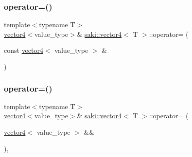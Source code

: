 \mbox{\label{classsaki_1_1vector4_a0fba7bd5e55de03aca8c11a952e7217f}} 
\subsubsection{\texorpdfstring{operator=()}{operator=()}\hspace{0.1cm}{\footnotesize\ttfamily [1/2]}}
{\footnotesize\ttfamily template$<$typename T$>$ \\
\mbox{\hyperlink{classsaki_1_1vector4}{vector4}}$<$value\+\_\+type$>$\& \mbox{\hyperlink{classsaki_1_1vector4}{saki\+::vector4}}$<$ T $>$\+::operator= (\begin{DoxyParamCaption}\item[{const \mbox{\hyperlink{classsaki_1_1vector4}{vector4}}$<$ value\+\_\+type $>$ \&}]{ }\end{DoxyParamCaption})\hspace{0.3cm}{\ttfamily [default]}}

\mbox{\label{classsaki_1_1vector4_a6e841a2c8d0467586902a4fc0fa6b9a4}} 
\subsubsection{\texorpdfstring{operator=()}{operator=()}\hspace{0.1cm}{\footnotesize\ttfamily [2/2]}}
{\footnotesize\ttfamily template$<$typename T$>$ \\
\mbox{\hyperlink{classsaki_1_1vector4}{vector4}}$<$value\+\_\+type$>$\& \mbox{\hyperlink{classsaki_1_1vector4}{saki\+::vector4}}$<$ T $>$\+::operator= (\begin{DoxyParamCaption}\item[{\mbox{\hyperlink{classsaki_1_1vector4}{vector4}}$<$ value\+\_\+type $>$ \&\&}]{ }\end{DoxyParamCaption})\hspace{0.3cm}{\ttfamily [default]}, {\ttfamily [noexcept]}}

\mbox{\label{classsaki_1_1vector4_a6f1d99c42ab1163a09614eed8062c9b5}} 

